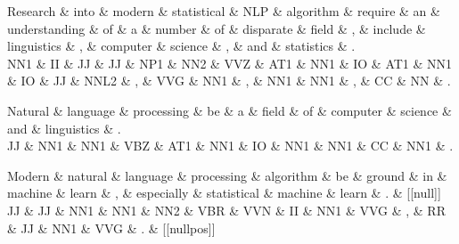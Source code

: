 \documentclass{article}
\begin{document}
\begin{dependency}[theme = simple]
\begin{deptext}[column sep=1em]
Research \& into \& modern \& statistical \& NLP \& algorithm \& require \& an \& understanding \& of \& a \& number \& of \& disparate \& field \& , \& include \& linguistics \& , \& computer \& science \& , \& and \& statistics \& . \\
NN1 \& II \& JJ \& JJ \& NP1 \& NN2 \& VVZ \& AT1 \& NN1 \& IO \& AT1 \& NN1 \& IO \& JJ \& NNL2 \& , \& VVG \& NN1 \& , \& NN1 \& NN1 \& , \& CC \& NN \& . \\
\end{deptext}
\end{dependency}

\begin{dependency}[theme = simple]
\begin{deptext}[column sep=1em]
Natural \& language \& processing \& be \& a \& field \& of \& computer \& science \& and \& linguistics \& . \\
JJ \& NN1 \& NN1 \& VBZ \& AT1 \& NN1 \& IO \& NN1 \& NN1 \& CC \& NN1 \& . \\
\end{deptext}
\end{dependency}

\begin{dependency}[theme = simple]
\begin{deptext}[column sep=1em]
Modern \& natural \& language \& processing \& algorithm \& be \& ground \& in \& machine \& learn \& , \& especially \& statistical \& machine \& learn \& . \& {[}{[}null{]}{]} \\
JJ \& JJ \& NN1 \& NN1 \& NN2 \& VBR \& VVN \& II \& NN1 \& VVG \& , \& RR \& JJ \& NN1 \& VVG \& . \& {[}{[}nullpos{]}{]} \\
\end{deptext}
\end{dependency}
\end{document}
